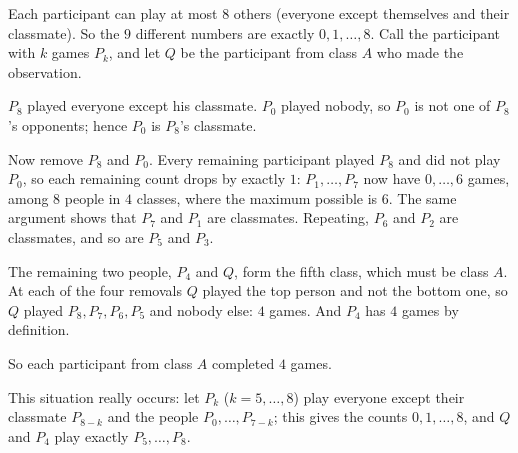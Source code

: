 Each participant can play at most $8$ others (everyone except themselves and their classmate). So the $9$ different numbers are exactly $0,1,\dots,8$. Call the participant with $k$ games $P_k$, and let $Q$ be the participant from class $A$ who made the observation.

$P_8$ played everyone except his classmate. $P_0$ played nobody, so $P_0$ is not one of $P_8$'s opponents; hence $P_0$ is $P_8$'s classmate.

Now remove $P_8$ and $P_0$. Every remaining participant played $P_8$ and did not play $P_0$, so each remaining count drops by exactly $1$: $P_1,\dots,P_7$ now have $0,\dots,6$ games, among $8$ people in $4$ classes, where the maximum possible is $6$. The same argument shows that $P_7$ and $P_1$ are classmates. Repeating, $P_6$ and $P_2$ are classmates, and so are $P_5$ and $P_3$.

The remaining two people, $P_4$ and $Q$, form the fifth class, which must be class $A$. At each of the four removals $Q$ played the top person and not the bottom one, so $Q$ played $P_8,P_7,P_6,P_5$ and nobody else: $4$ games. And $P_4$ has $4$ games by definition.

So each participant from class $A$ completed $\boxed{4}$ games.

This situation really occurs: let $P_k$ ($k=5,\dots,8$) play everyone except their classmate $P_{8-k}$ and the people $P_0,\dots,P_{7-k}$; this gives the counts $0,1,\dots,8$, and $Q$ and $P_4$ play exactly $P_5,\dots,P_8$.
